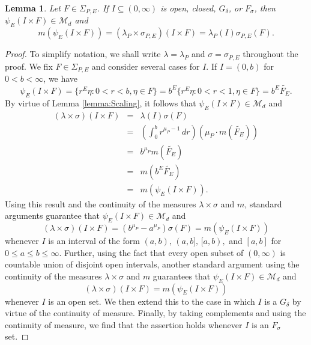 \documentclass[11pt]{article}
\newtheorem{lemma}[theorem]{Lemma}
\theoremstyle{remark}
\begin{document}
\begin{lemma}\label{lem:SpecialRectangle}
Let $F\in\Sigma_{P,E}$. If $I\subseteq (0,\infty)$ is open, closed, $G_\delta$, or $F_\sigma$, then $\psi_E(I\times F)\in\mathcal{M}_d$ and
\begin{equation}\label{eq:SpecialRectangle}
m(\psi_E(I\times F))=(\lambda_P\times\sigma_{P,E})(I\times F)=\lambda_P(I)\sigma_{P,E}(F).
\end{equation}
\end{lemma}
\begin{proof}
To simplify notation, we shall write $\lambda=\lambda_P$ and $\sigma=\sigma_{P,E}$ throughout the proof. We fix $F\in\Sigma_{P,E}$ and consider several cases for $I$. If $I=(0,b)$ for $0<b<\infty$, we have
\begin{equation*}
\psi_E(I\times F)=\{r^E\eta:0<r<b,\eta\in F\}=b^E\{r^E\eta:0<r<1,\eta \in F\}=b^E\widetilde{F_E}.
\end{equation*}
By virtue of Lemma \ref{lemma:Scaling}, it follows that $\psi_E(I\times F)\in\mathcal{M}_d$ and
\begin{eqnarray*}
(\lambda\times\sigma)(I\times F)&=&\lambda(I)\sigma(F)\\
&=&\left(\int_0^b r^{\mu_P-1}\,dr\right)\left(\mu_P\cdot m(\widetilde{F_E})\right)\\
&=&b^{\mu_P}m(\widetilde{F_E})\\
&=&m(b^{E}\widetilde{F_E})\\
&=&m(\psi_E(I\times F)).
\end{eqnarray*}
Using this result and the continuity of the measures $\lambda\times\sigma$ and $m$, standard arguments guarantee that $\psi_E(I\times F)\in\mathcal{M}_d$ and
\begin{equation*}
    (\lambda\times\sigma)(I\times F)=\left(b^{\mu_P}-a^{\mu_P}\right)\sigma(F)=m(\psi_E(I\times F))
\end{equation*}
whenever $I$ is an interval of the form $(a,b),\,(a,b],\,[a,b),$ and $[a,b]$ for $0\leq a\leq b\leq \infty$. Further, using the fact that every open subset of $(0,\infty)$ is countable union of disjoint open intervals, another standard argument using the continuity of the measures $\lambda\times \sigma$ and $m$ guarantees that $\psi_E(I\times F)\in\mathcal{M}_d$ and
\begin{equation*}
    (\lambda\times\sigma)(I\times F)=m(\psi_E(I\times F))
\end{equation*}
whenever $I$ is an open set. We then extend this to the case in which $I$ is a $G_\delta$ by virtue of the continuity of measure. Finally, by taking complements and using the continuity of measure, we find that the assertion holds whenever $I$ is an $F_\sigma$ set. 
\end{proof}
\end{document}

